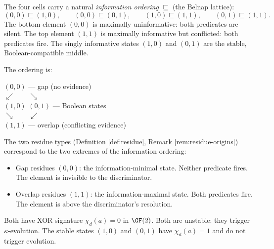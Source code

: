 \begin{definition}\label{def:info-order}
The four cells carry a natural \emph{information ordering}
$\sqsubseteq$ (the Belnap lattice):
\begin{equation}
  (0,0) \sqsubseteq (1,0), \qquad
  (0,0) \sqsubseteq (0,1), \qquad
  (1,0) \sqsubseteq (1,1), \qquad
  (0,1) \sqsubseteq (1,1).
\end{equation}
The bottom element $(0,0)$ is maximally uninformative:
both predicates are silent. The top element $(1,1)$ is
maximally informative but conflicted: both predicates
fire. The singly informative states $(1,0)$ and $(0,1)$
are the stable, Boolean-compatible middle.

The ordering is:
\begin{center}
$(0,0)$ --- gap (no evidence) \\[2pt]
$\swarrow \qquad \searrow$ \\[2pt]
$(1,0)$ \qquad\quad $(0,1)$ --- Boolean states \\[2pt]
$\searrow \qquad \swarrow$ \\[2pt]
$(1,1)$ --- overlap (conflicting evidence)
\end{center}
\end{definition}

\begin{proposition}\label{prop:extremal}
The two residue types (Definition \ref{def:residue},
Remark \ref{rem:residue-origins}) correspond to the two
extremes of the information ordering:
\begin{itemize}[nosep]
  \item Gap residues $(0,0)$: the information-minimal state.
    Neither predicate fires. The element is invisible to
    the discriminator.
  \item Overlap residues $(1,1)$: the information-maximal
    state. Both predicates fire. The element is above the
    discriminator's resolution.
\end{itemize}
Both have XOR signature $\chi_d(a) = 0$ in $\GF(2)$. Both
are unstable: they trigger $\kappa$-evolution. The stable
states $(1,0)$ and $(0,1)$ have $\chi_d(a) = 1$ and do not
trigger evolution.
\end{proposition}


